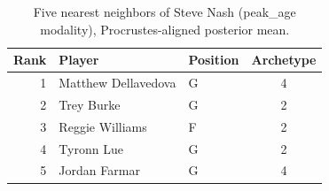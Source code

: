 \begin{table}[htbp]
  \centering\small
  \begin{tabular}{rllc}
    \toprule
    Rank & Player & Position & Archetype \\
    \midrule
    1 & Matthew Dellavedova & G & 4 \\
    2 & Trey Burke & G & 2 \\
    3 & Reggie Williams & F & 2 \\
    4 & Tyronn Lue & G & 2 \\
    5 & Jordan Farmar & G & 4 \\
    \bottomrule
  \end{tabular}
  \caption{Five nearest neighbors of Steve Nash (peak_age modality), Procrustes-aligned posterior mean.}
  \label{tab:Steve_Nash_neighbors_peak_age}
\end{table}

